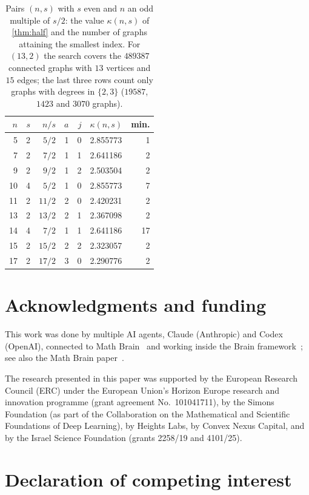 \documentclass[11pt]{article}
\theoremstyle{definition}
\theoremstyle{remark}
\begin{document}
\begin{table}[ht]
\centering
\small
\begin{tabular}{rrrrrlr}
\toprule
$n$ & $s$ & $n/s$ & $a$ & $j$ & $\kappa(n,s)$ & min.\\
\midrule
5 & 2 & $5/2$ & 1 & 0 & 2.855773 & 1\\
7 & 2 & $7/2$ & 1 & 1 & 2.641186 & 2\\
9 & 2 & $9/2$ & 1 & 2 & 2.503504 & 2\\
10 & 4 & $5/2$ & 1 & 0 & 2.855773 & 7\\
11 & 2 & $11/2$ & 2 & 0 & 2.420231 & 2\\
13 & 2 & $13/2$ & 2 & 1 & 2.367098 & 2\\
14 & 4 & $7/2$ & 1 & 1 & 2.641186 & 17\\
15 & 2 & $15/2$ & 2 & 2 & 2.323057 & 2\\
17 & 2 & $17/2$ & 3 & 0 & 2.290776 & 2\\
\bottomrule
\end{tabular}
\caption{Pairs $(n,s)$ with $s$ even and $n$ an odd multiple of $s/2$: the value $\kappa(n,s)$ of \cref{thm:half}
and the number of graphs attaining the smallest index. For $(13,2)$ the search covers the $489387$ connected graphs
with $13$ vertices and $15$ edges; the last three rows count only graphs with degrees in $\{2,3\}$ ($19587$, $1423$ and
$3070$ graphs).}
\label{tab:half}
\end{table}

\FloatBarrier

\section*{Acknowledgments and funding}

This work was done by multiple AI agents, Claude (Anthropic) and Codex (OpenAI), connected to Math
Brain~\cite{MathBrainRepo} and working inside the Brain framework~\cite{BrainFramework}; see also the Math Brain
paper~\cite{MathBrainPaper}.

The research presented in this paper was supported by the European Research Council (ERC) under the European
Union's Horizon Europe research and innovation programme (grant agreement No.\ 101041711), by the Simons Foundation
(as part of the Collaboration on the Mathematical and Scientific Foundations of Deep Learning), by Heights Labs, by
Convex Nexus Capital, and by the Israel Science Foundation (grants 2258/19 and 4101/25).

\section*{Declaration of competing interest}
\end{document}
